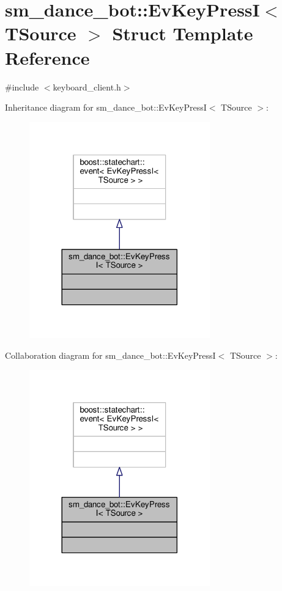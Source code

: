 \hypertarget{structsm__dance__bot_1_1EvKeyPressI}{}\section{sm\+\_\+dance\+\_\+bot\+:\+:Ev\+Key\+PressI$<$ T\+Source $>$ Struct Template Reference}
\label{structsm__dance__bot_1_1EvKeyPressI}


{\ttfamily \#include $<$keyboard\+\_\+client.\+h$>$}



Inheritance diagram for sm\+\_\+dance\+\_\+bot\+:\+:Ev\+Key\+PressI$<$ T\+Source $>$\+:
\nopagebreak
\begin{figure}[H]
\begin{center}
\leavevmode
\includegraphics[width=221pt]{structsm__dance__bot_1_1EvKeyPressI__inherit__graph}
\end{center}
\end{figure}


Collaboration diagram for sm\+\_\+dance\+\_\+bot\+:\+:Ev\+Key\+PressI$<$ T\+Source $>$\+:
\nopagebreak
\begin{figure}[H]
\begin{center}
\leavevmode
\includegraphics[width=221pt]{structsm__dance__bot_1_1EvKeyPressI__coll__graph}
\end{center}
\end{figure}


